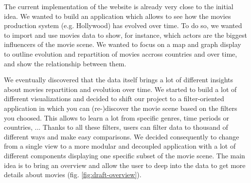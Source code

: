 \documentclass[a4paper,10pt]{article}
\begin{document}
The current implementation of the website is already very close to the initial idea.
We wanted to build an application which allows to see how the movies production
system (e.g. Hollywood) has evolved over time. To do so, we wanted to import and
use movies data to show, for instance, which actors are the biggest influencers of
the movie scene. We wanted to focus on a map and graph display to outline evolution
and repartition of movies accross countries and over time, and show the relationship between
them.

We eventually discovered that the data itself brings a lot of different insights
about movies repartition and evolution over time. We started to build a lot of different
visualizations and decided to shift our project to a filter-oriented application
in which you can (re-)discover the movie scene based on the filters you choosed.
This allows to learn a lot from specific genres, time periods or countries, ...
Thanks to all these filters, users can filter data to thousand of different
ways and make easy comparisons. We decided consequently to change from a single
view to a more modular and decoupled application with a lot of different components
displaying one specific subset of the movie scene. The main idea is to bring an
overview and allow the user to deep into the data to get more details about movies (fig. \ref{fig:draft-overview}).
\end{document}
